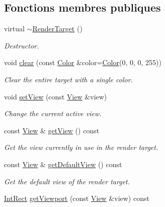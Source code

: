 \subsection*{Fonctions membres publiques}
\begin{DoxyCompactItemize}
\item 
\mbox{\label{classsf_1_1RenderTarget_a9abd1654a99fba46f6887b9c625b9b06}} 
virtual \hyperlink{classsf_1_1RenderTarget_a9abd1654a99fba46f6887b9c625b9b06}{$\sim$\+Render\+Target} ()
\begin{DoxyCompactList}\small\item\em Destructor. \end{DoxyCompactList}\item 
void \hyperlink{classsf_1_1RenderTarget_a6bb6f0ba348f2b1e2f46114aeaf60f26}{clear} (const \hyperlink{classsf_1_1Color}{Color} \&color=\hyperlink{classsf_1_1Color}{Color}(0, 0, 0, 255))
\begin{DoxyCompactList}\small\item\em Clear the entire target with a single color. \end{DoxyCompactList}\item 
void \hyperlink{classsf_1_1RenderTarget_a063db6dd0a14913504af30e50cb6d946}{set\+View} (const \hyperlink{classsf_1_1View}{View} \&view)
\begin{DoxyCompactList}\small\item\em Change the current active view. \end{DoxyCompactList}\item 
const \hyperlink{classsf_1_1View}{View} \& \hyperlink{classsf_1_1RenderTarget_a2c179503b4dcdf5282ef6426d317602c}{get\+View} () const
\begin{DoxyCompactList}\small\item\em Get the view currently in use in the render target. \end{DoxyCompactList}\item 
const \hyperlink{classsf_1_1View}{View} \& \hyperlink{classsf_1_1RenderTarget_ad3b533c3f899d7044d981ed607aef9be}{get\+Default\+View} () const
\begin{DoxyCompactList}\small\item\em Get the default view of the render target. \end{DoxyCompactList}\item 
\hyperlink{classsf_1_1Rect}{Int\+Rect} \hyperlink{classsf_1_1RenderTarget_a865d462915dc2a1fae2ebfb3300382ac}{get\+Viewport} (const \hyperlink{classsf_1_1View}{View} \&view) const

\end{DoxyCompactItemize}
